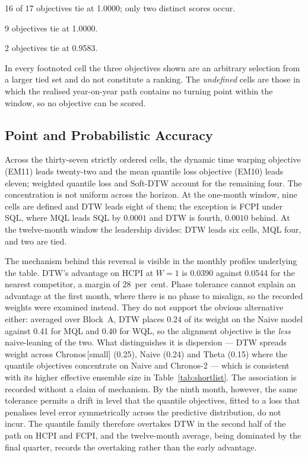 \documentclass[12pt]{article}
\begin{document}
\begin{table}[htbp]
\begin{threeparttable}
\begin{tablenotes}[flushleft]
\item[e] 16 of 17 objectives tie at 1.0000; only two distinct scores occur.
\item[f] 9 objectives tie at 1.0000.
\item[g] 2 objectives tie at 0.9583.
\item In every footnoted cell the three objectives shown are an arbitrary
selection from a larger tied set and do not constitute a ranking. The
\emph{undefined} cells are those in which the realised year-on-year path
contains no turning point within the window, so no objective can be scored.
\end{tablenotes}
\end{threeparttable}
\end{table}

\subsection{Point and Probabilistic Accuracy}
\label{sec:res-point}

Across the thirty-seven strictly ordered cells, the dynamic time warping
objective (EM11) leads twenty-two and the mean quantile loss objective (EM10)
leads eleven; weighted quantile loss and Soft-DTW account for the remaining
four. The concentration is not uniform across the horizon. At the one-month
window, nine cells are defined and DTW leads eight of them; the exception is
FCPI under SQL, where MQL leads SQL by $0.0001$ and DTW is fourth, $0.0010$
behind. At the twelve-month window the leadership divides: DTW leads six cells,
MQL four, and two are tied.

The mechanism behind this reversal is visible in the monthly profiles
underlying the table. DTW's advantage on HCPI at $W=1$ is 0.0390 against
0.0544 for the nearest competitor, a margin of 28~per~cent. Phase tolerance
cannot explain an advantage at the first month, where there is no phase to
misalign, so the recorded weights were examined instead. They do not support
the obvious alternative either: averaged over Block~A, DTW places 0.24 of its
weight on the Naive model against 0.41 for MQL and 0.40 for WQL, so the
alignment objective is the \emph{less} naive-leaning of the two. What
distinguishes it is dispersion --- DTW spreads weight across Chronos\,[small]
(0.25), Naive (0.24) and Theta (0.15) where the quantile objectives concentrate
on Naive and Chronos-2 --- which is consistent with its higher effective
ensemble size in Table~\ref{tab:shortlist}. The association is recorded
without a claim of mechanism. By the ninth month, however, the same tolerance permits a drift in
level that the quantile objectives, fitted to a loss that penalises level error
symmetrically across the predictive distribution, do not incur. The quantile
family therefore overtakes DTW in the second half of the path on HCPI and FCPI,
and the twelve-month average, being dominated by the final quarter, records the
overtaking rather than the early advantage.
\end{document}
